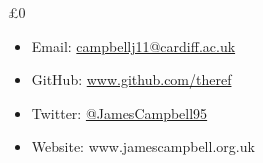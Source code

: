 \documentclass{beamer}
\begin{document}
\begin{frame}{}
  \begin{center}
    {\fontsize{5cm}{5.5cm} \selectfont £0}
  \end{center}
\end{frame}

\begin{frame}[standout]
  \begin{itemize}
    \itemsep2em
    \item Email: \href{mailto:campbellj11@cardiff.ac.uk}{campbellj11@cardiff.ac.uk}

    \item GitHub: \href{https://github.com/theref}{www.github.com/theref}

    \item Twitter: \href{https://twitter.com/JamesCampbell95}{@JamesCampbell95}

    \item Website: www.jamescampbell.org.uk
  \end{itemize}
\end{frame}
\end{document}
